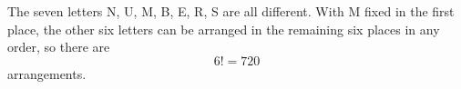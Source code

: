 The seven letters N, U, M, B, E, R, S are all different. With M fixed in the first place, the other six letters can be arranged in the remaining six places in any order, so there are
\[
6!=\boxed{720}
\]
arrangements.
